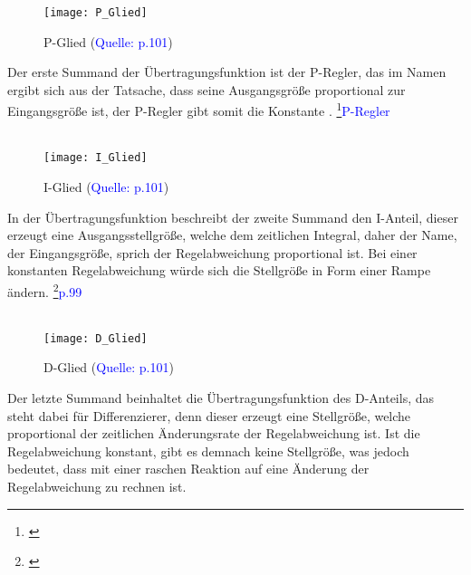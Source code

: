 \documentclass[titlepage,12pt,twoside]{article}
\begin{document}
\begin{figure}[H]
	\begin{center}
		\scalebox{1.2}
		{\texttt{[image: P\_Glied]}}
		\caption{P-Glied (\textcolor{blue}{Quelle: \cite{Haager}p.101})}
		\label{fig:P_Glied}
	\end{center}
\end{figure}
\hfill \break
Der erste Summand  der Übertragungsfunktion ist der P-Regler, das 
 im Namen ergibt sich aus der Tatsache, dass seine Ausgangsgröße 
proportional zur Eingangsgröße ist, der P-Regler gibt somit die 
Konstante . \footnote{\cite{Q9}}\textcolor{blue}{P-Regler} \\
\\
\begin{figure}[H]
	\begin{center}
		\scalebox{1.2}
		{\texttt{[image: I\_Glied]}}
		\caption{I-Glied (\textcolor{blue}{Quelle: \cite{Haager}p.101})}
		\label{fig:I_Glied}
	\end{center}
\end{figure}
\hfill \break
In der Übertragungsfunktion beschreibt der zweite Summand den I-Anteil, 
dieser erzeugt eine Ausgangsstellgröße, welche dem zeitlichen Integral, 
daher der Name, der Eingangsgröße, sprich der Regelabweichung 
proportional ist. Bei einer konstanten Regelabweichung würde sich die 
Stellgröße in Form einer Rampe ändern. \footnote{\cite{Haager}}\textcolor{blue}{p.99} \\
\\
\begin{figure}[H]
	\begin{center}
		\scalebox{1.2}
		{\texttt{[image: D\_Glied]}}
		\caption{D-Glied (\textcolor{blue}{Quelle: \cite{Haager}p.101})}
		\label{fig:D_Glied}
	\end{center}
\end{figure}
\hfill \break
Der letzte Summand beinhaltet die Übertragungsfunktion des D-Anteils, 
das  steht dabei für Differenzierer, denn dieser erzeugt eine 
Stellgröße, welche proportional der zeitlichen Änderungsrate der 
Regelabweichung ist. Ist die Regelabweichung konstant, gibt es demnach 
keine Stellgröße, was jedoch bedeutet, dass mit einer raschen Reaktion 
auf eine Änderung der Regelabweichung zu rechnen ist. \\
\end{document}
